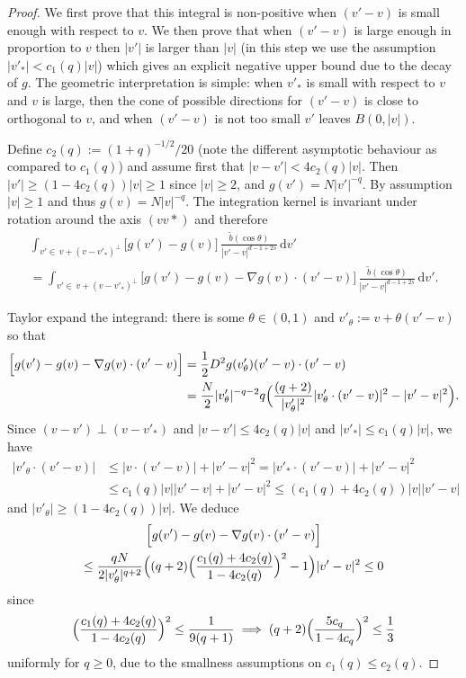 \documentclass[JEP,XML,SOM,Unicode,NoFloatCountersInSection]{cedram}
\theoremstyle{plain}
\theoremstyle{definition}
\numberwithin{equation}{section}
\newcommand{\dd} {\, \mathrm{d}}
\let\A N
\begin{document}
\begin{proof}
We first prove that this integral is non-positive when $(v'-v)$ is
small enough with respect to $v$. We then prove that when $(v'-v)$
is large enough in proportion to $v$ then $|v'|$ is larger than
$|v|$ (in this step we use the assumption $|v'_*| < c_1(q) |v|$) which
gives an explicit negative upper bound due to the decay of $g$. The
geometric interpretation is simple: when $v'_*$ is small with
respect to $v$ and $v$ is large, then the cone of possible
directions for $(v'-v)$ is close to orthogonal to $v$, and when
$(v'-v)$ is not too small $v'$ leaves $B(0,|v|)$.

Define $c_2(q) := (1+q)^{-1/2}/20$ (note the different asymptotic
behaviour as compared to $c_1(q)$) and assume first that
$|v-v'| < 4 c_2(q) |v|$. Then $|v'| \ge (1-4c_2(q))|v| \ge 1$ since
$|v| \ge 2$, and $g(v') = N |v'|^{-q}$. By assumption $|v| \ge 1$
and thus $g(v) = N |v|^{-q}$. The integration kernel is invariant
under rotation around the axis $(vv*)$ and therefore
\begin{multline*}
\int_{v'\in \, v + (v-v'_*)^\bot} \big[ g(v') - g(v)\big]\, \frac{\tilde
b(\cos \theta)}{|v'-v|^{d-1+2s}} \dd v' \\ =
\int_{v'\in \, v + (v-v'_*)^\bot} \Big[ g(v') - g(v) - \nabla g(v)
\cdot (v'-v) \Big]\, \frac{\tilde
b(\cos \theta)}{|v'-v|^{d-1+2s}} \dd v'.
\end{multline*}

Taylor expand the integrand: there is some $\theta \in (0,1)$ and
$v'_\theta := v + \theta(v'-v)$ so that
\begin{align}
\nonumber
\Big[ g(v')-g(v) - \nabla g (v) \cdot (v'-v) \Big]
&= \frac12 D^2 g (v'_\theta) (v'-v)\cdot (v'-v) \\
\label{eq:taylor}
& = \frac{\A}{2} |v'_\theta |^{-q-2} q
\Bigl(\frac{(q+2)}{|v'_\theta|^2} |v'_\theta \cdot (v'-v)|^2 - |v'-v|^2 \Bigr).
\end{align}
Since $(v-v') \perp (v-v'_*)$ and $|v-v'| \le 4 c_2(q) |v|$ and $|v'_*|\le c_1(q) |v|$, we have
\begin{align*}
|v'_\theta \cdot (v'-v)| & \le |v\cdot (v'-v)| + |v'-v|^2 = |v'_*
\cdot (v'-v)| + |v'-v|^2 \\ & \le c_1(q) |v||v'-v| + |v'-v|^2 \le
\left( c_1(q) + 4 c_2(q) \right) |v| |v'-v|
\end{align*}
and $|v'_\theta| \geq (1-4c_2(q)) |v|$. We deduce
\begin{multline} \label{e:small z}
\Big[ g(v')-g(v) - \nabla g (v) \cdot (v'-v) \Big]\\
\le \frac{q
\A}{2|v'_\theta |^{q+2}}
\Bigl((q+2)\Bigl(\frac{c_1(q) + 4 c_2(q)}{1-4c_2(q)}\Bigr)^2-1 \Bigr)|v'-v|^2 \le 0
\end{multline}
since
\[
\Bigl(\frac{c_1(q)+4c_2(q)}{1-4c_2(q)}\Bigr)^2 \le \frac{1}{9(q+1)} \implies (q+2) \Bigl(\frac{5c_q}{1-4c_q}\Bigr)^2 \le \frac{1}{3}
\]
uniformly for $q \ge 0$, due to the smallness assumptions on
$c_1(q) \le c_2(q)$.


\end{proof}
\end{document}
